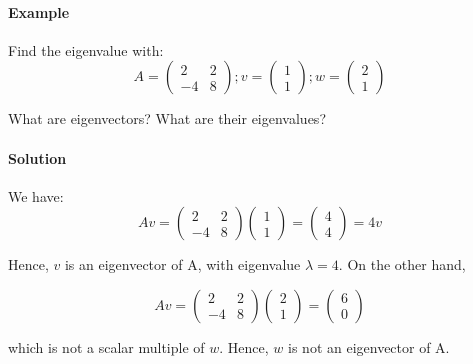 \documentclass[a4paper,12pt]{article}
\begin{document}
\begin{frame}
\paragraph{Example} Find the eigenvalue with:
\[       
    A = 
    \left(
    \begin{array}{cc}
    2 & 2 \\
    -4 & 8
    \end{array}
    \right)
    ; v =
    \left(
    \begin{array}{c}
    1 \\
    1
    \end{array}
    \right)
    ; w = 
    \left(
    \begin{array}{c}
    2 \\
    1
    \end{array}
    \right)
\]

What are eigenvectors? What are their eigenvalues?
\paragraph{Solution} We have:
\[       
    Av = 
    \left(
    \begin{array}{cc}
    2 & 2 \\
    -4 & 8
    \end{array}
    \right)
    \left(
    \begin{array}{c}
    1 \\
    1
    \end{array}
    \right)
    = 
    \left(
    \begin{array}{c}
    4 \\
    4
    \end{array}
    \right)
    = 4v
\]

Hence, \(v\) is an eigenvector of A, with eigenvalue \(\lambda=4\). On the other hand,

\[       
    Av = 
    \left(
    \begin{array}{cc}
    2 & 2 \\
    -4 & 8
    \end{array}
    \right)
    \left(
    \begin{array}{c}
    2 \\
    1
    \end{array}
    \right)
    = 
    \left(
    \begin{array}{c}
    6 \\
    0
    \end{array}
    \right)
\]

which is not a scalar multiple of \(w\). Hence, \(w\) is not an eigenvector of A.
\newpage


\end{frame}
\end{document}
